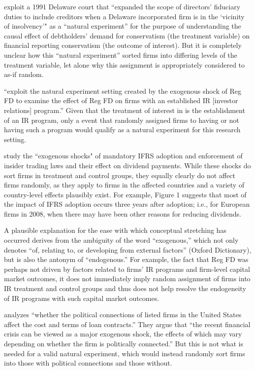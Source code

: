 \documentclass[11pt]{amsart}
\begin{document}
\cite{Aier:2014ii} exploit a 1991 Delaware court that ``expanded the scope of directors' fiduciary duties to include creditors when a Delaware incorporated firm is in the `vicinity of insolvency'" as a ``natural experiment'' for the purpose of understanding the causal effect of debtholders' demand for conservatism (the treatment variable) on financial reporting conservatism (the outcome of interest).
But it is completely unclear how this ``natural experiment'' sorted firms into differing levels of the treatment variable, let alone why this assignment is appropriately considered to as-if random.

\citet{Kirk:2014gx} ``exploit the natural experiment setting created by the exogenous shock of Reg FD to examine the effect of Reg FD on firms with an established IR [investor relations] program.'' 
Given that the treatment of interest in \citet{Kirk:2014gx} is the establishment of an IR program, only a event that randomly assigned firms to having or not having such a program would qualify as a natural experiment for this research setting.

\citet{Hail:2014fq} study the ``exogenous shocks" of mandatory IFRS adoption and enforcement of insider trading laws and their effect on dividend payments.
While these shocks do sort firms in treatment and control groups, they equally clearly do not affect firms randomly, as they apply to firms in the affected countries and a variety of country-level effects plausibly exist. 
For example, Figure 1 \citet{Hail:2014fq} suggests that most of the impact of IFRS adoption occurs three years after adoption; i.e., for European firms in 2008, when there may have been other reasons for reducing dividends.

A plausible explanation for the ease with which conceptual stretching has occurred derives from the ambiguity of the word ``exogenous,'' which not only denotes  ``of, relating to, or developing from external factors'' (Oxford Dictionary), but is also the antonym of ``endogenous.''
For example, the fact that Reg FD was perhaps not driven by factors related to firms' IR programs and firm-level capital market outcomes, it does not immediately imply random assignment of firms into IR treatment and control groups and thus does not help resolve the endogeneity of IR programs with such capital market outcomes.

\citet{Houston:2014hv} analyzes ``whether the political connections of listed firms in the United States affect the cost and terms of loan contracts.'' They argue that ``the recent financial crisis can be viewed as a major exogenous shock, the effects of which may vary depending on whether the firm is politically connected.'' 
But this is not what is needed for a valid natural experiment, which would instead randomly sort firms into those with political connections and those without. 
\end{document}
